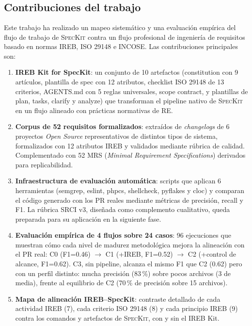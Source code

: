 \chapter{\conclusionsname}
\label{chap:conclusiones}

\section{Contribuciones del trabajo}

Este trabajo ha realizado un mapeo sistem\'atico y una evaluaci\'on emp\'irica del flujo de trabajo de \textsc{SpecKit} contra un flujo profesional de ingenier\'ia de requisitos basado en normas IREB, ISO 29148 e INCOSE. Las contribuciones principales son:

\begin{enumerate}
    \item \textbf{IREB Kit for SpecKit}: un conjunto de 10 artefactos (constitution con 9 art\'iculos, plantilla de spec con 12 atributos, checklist ISO 29148 de 13 criterios, AGENTS.md con 5 reglas universales, scope contract, y plantillas de plan, tasks, clarify y analyze) que transforman el pipeline nativo de \textsc{SpecKit} en un flujo alineado con pr\'acticas normativas de RE.

    \item \textbf{Corpus de 52 requisitos formalizados}: extra\'idos de \emph{changelogs} de 6 proyectos \emph{Open Source} representativos de distintos tipos de sistema, formalizados con 12 atributos IREB y validados mediante r\'ubrica de calidad. Complementado con 52 MRS (\emph{Minimal Requirement Specifications}) derivados para replicabilidad.

    \item \textbf{Infraestructura de evaluaci\'on autom\'atica}: scripts que aplican 6 herramientas (semgrep, eslint, phpcs, shellcheck, pyflakes y cloc) y comparan el c\'odigo generado con los PR reales mediante m\'etricas de precisi\'on, recall y F1. La r\'ubrica SRCI v3, dise\~nada como complemento cualitativo, queda preparada para su aplicaci\'on en la siguiente fase.

    \item \textbf{Evaluaci\'on emp\'irica de 4 flujos sobre 24 casos}: 96 ejecuciones que muestran c\'omo cada nivel de madurez metodol\'ogica mejora la alineaci\'on con el PR real: C0 (F1=0.46) $\rightarrow$ C1 (+IREB, F1=0.52) $\rightarrow$ C2 (+control de alcance, F1=0.62). C3, sin pipeline, alcanza el mismo F1 que C2 (0.62) pero con un perfil distinto: mucha precisi\'on (83\,\%) sobre pocos archivos (3 de media), frente al equilibrio de C2 (70\,\% de precisi\'on sobre 15 archivos).

    \item \textbf{Mapa de alineaci\'on IREB--SpecKit}: contraste detallado de cada actividad IREB (7), cada criterio ISO 29148 (8) y cada principio IREB (9) contra los comandos y artefactos de \textsc{SpecKit}, con y sin el IREB Kit.
\end{enumerate}

